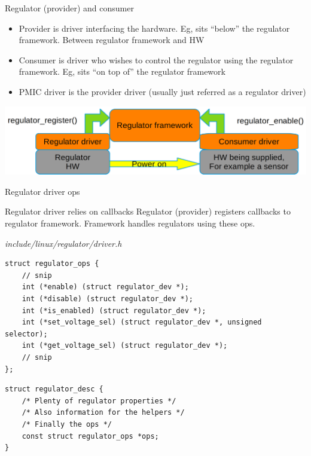 \documentclass[10pt]{beamer}
\begin{document}

\begin{frame}[t]{Regulator (provider) and consumer}\vspace{4pt}


\begin{itemize}
	\item Provider is driver interfacing the hardware. Eg, sits “below” the regulator framework. Between regulator framework and HW
	\item Consumer is driver who wishes to control the regulator using the regulator framework. Eg, sits “on top of” the regulator framework
	\item PMIC driver is the provider driver (usually just referred as a regulator driver) \\[10pt]
\end{itemize}
\includegraphics[width=1\linewidth]{img/regulator_users.png}
\end{frame}

\newcommand{\mycfile}[1]{\textit{\small #1}}


\begin{frame}[fragile, t]{Regulator driver ops}\vspace{4pt}
\begin{block}{Regulator driver relies on callbacks}
Regulator (provider) registers callbacks to regulator framework.
Framework handles regulators using these ops.
\end{block}

\mycfile{include/linux/regulator/driver.h}
\lstset{language=C}
\scriptsize
\begin{lstlisting}
struct regulator_ops {
	// snip
	int (*enable) (struct regulator_dev *);
	int (*disable) (struct regulator_dev *);
	int (*is_enabled) (struct regulator_dev *);
	int (*set_voltage_sel) (struct regulator_dev *, unsigned selector);
	int (*get_voltage_sel) (struct regulator_dev *);
	// snip
};
\end{lstlisting}
\pause

\begin{lstlisting}
struct regulator_desc {
	/* Plenty of regulator properties */
	/* Also information for the helpers */
	/* Finally the ops */
	const struct regulator_ops *ops;
}
\end{lstlisting}
\end{frame}
\end{document}
